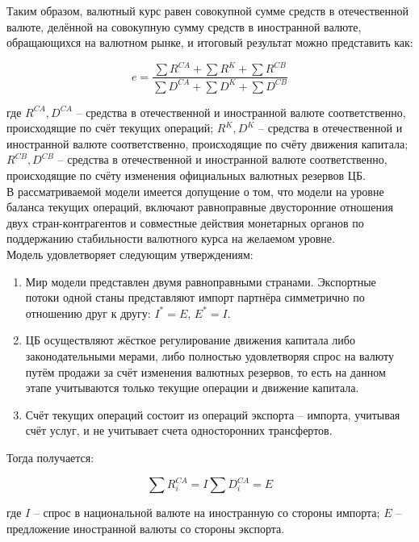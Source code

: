 Таким образом, валютный курс равен совокупной сумме средств в отечественной валюте, делённой на совокупную сумму средств в иностранной валюте, обращающихся на валютном рынке, и итоговый результат можно представить как:

\[e = \dfrac{\sum R^{CA} + \sum R^K + \sum R^{CB}}{\sum D^{CA} + \sum D^K + \sum D^{CB}} \]

где $R^{CA}, D^{CA}$ -- средства в отечественной и иностранной валюте соответственно, происходящие по счёт текущих операций; $R^{K}, D^{K}$ -- средства в отечественной и иностранной валюте соответственно, происходящие по счёту движения капитала; $R^{CB}, D^{CB}$ -- средства в отечественной и иностранной валюте соответственно, происходящие по счёту изменения официальных валютных резервов ЦБ.\\

В рассматриваемой модели имеется допущение о том, что модели на уровне баланса текущих операций, включают равноправные двусторонние отношения двух стран-контрагентов и совместные действия монетарных органов по поддержанию стабильности валютного курса на желаемом уровне.\\

Модель удовлетворяет следующим утверждениям:
\begin{enumerate}[topsep=0pt,itemsep=-1ex,partopsep=1ex,parsep=1ex]
	\item Мир модели представлен двумя равноправными странами. Экспортные потоки одной станы представляют импорт партнёра симметрично по отношению друг к другу: $I^* = E$, $E^* = I$.
	\item ЦБ осуществляют жёсткое регулирование движения капитала либо законодательными мерами, либо полностью удовлетворяя спрос на валюту путём продажи за счёт изменения валютных резервов, то есть на данном этапе учитываются только текущие операции и движение капитала.
	\item Счёт текущих операций состоит из операций экспорта – импорта, учитывая счёт услуг, и не учитывает счета односторонних трансфертов.\\
\end{enumerate}

Тогда получается:

\[ \sum R_i^{CA} = I \sum D_i^{CA} = E\]

где $I$ -- спрос в национальной валюте на иностранную со стороны импорта; $E$ -- предложение иностранной валюты со стороны экспорта.\\

\newpage

